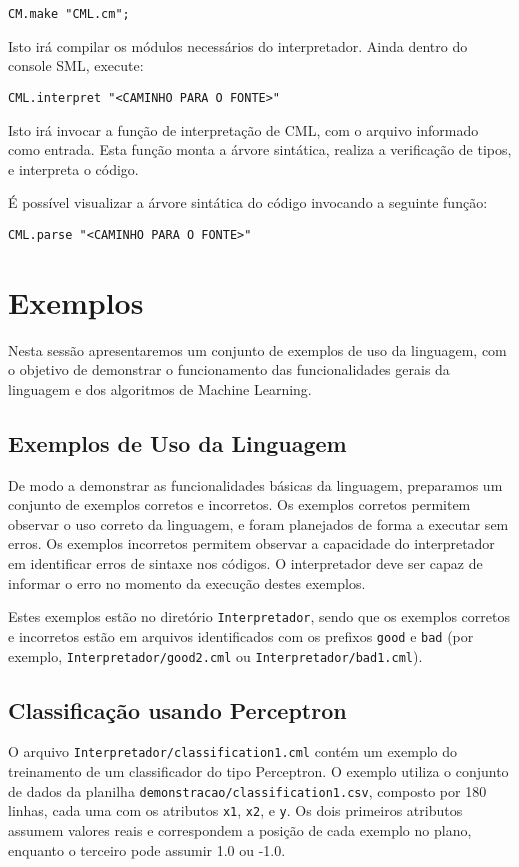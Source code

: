 \documentclass[12pt]{article}
\begin{document}
\begin{verbatim}
CM.make "CML.cm";
\end{verbatim}

Isto irá compilar os módulos necessários do interpretador. Ainda dentro do console SML, execute:

\begin{verbatim}
CML.interpret "<CAMINHO PARA O FONTE>"
\end{verbatim}

Isto irá invocar a função de interpretação de CML, com o arquivo informado como entrada. Esta função monta a árvore sintática, realiza a verificação de tipos, e interpreta o código.

É possível visualizar a árvore sintática do código invocando a seguinte função:

\begin{verbatim}
CML.parse "<CAMINHO PARA O FONTE>"
\end{verbatim}

\section{Exemplos}\label{Exemplos}

Nesta sessão apresentaremos um conjunto de exemplos de uso da linguagem, com o objetivo de demonstrar o funcionamento das funcionalidades gerais da linguagem e dos algoritmos de Machine Learning.

\subsection{Exemplos de Uso da Linguagem}

De modo a demonstrar as funcionalidades básicas da linguagem, preparamos um conjunto de exemplos corretos e incorretos. Os exemplos corretos permitem observar o uso correto da linguagem, e foram planejados de forma a executar sem erros. Os exemplos incorretos permitem observar a capacidade do interpretador em identificar erros de sintaxe nos códigos. O interpretador deve ser capaz de informar o erro no momento da execução destes exemplos.

Estes exemplos estão no diretório \texttt{Interpretador}, sendo que os exemplos corretos e incorretos estão em arquivos identificados com os prefixos \texttt{good} e \texttt{bad} (por exemplo, \texttt{Interpretador/good2.cml} ou \texttt{Interpretador/bad1.cml}).

\subsection{Classificação usando Perceptron}
O arquivo \texttt{Interpretador/classification1.cml} contém um exemplo do treinamento de um classificador do tipo Perceptron. O exemplo utiliza o conjunto de dados da planilha \texttt{demonstracao/classification1.csv}, composto por 180 linhas, cada uma com os atributos \texttt{x1}, \texttt{x2}, e \texttt{y}. Os dois primeiros atributos assumem valores reais e correspondem a posição de cada exemplo no plano, enquanto o terceiro pode assumir 1.0 ou -1.0.
\end{document}

